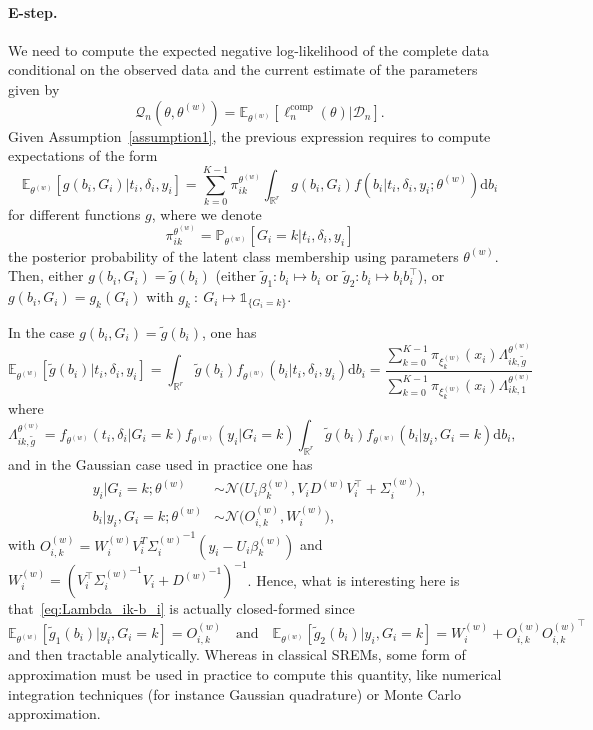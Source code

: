 \documentclass[11pt]{article}
\newcommand{\dd}{\mathrm{d}}
\newcommand{\ind}[1]{\mathds{1}_{#1}}
\newcommand{\cD}{\mathcal D}
\newcommand{\cN}{\mathcal N}
\newcommand{\cQ}{\mathcal Q}
\newcommand{\R}{\mathds R}
\newcommand{\E}{\mathds E}
\renewcommand{\P}{\mathds P}
\begin{document}
\paragraph*{E-step.}

We need to compute the expected negative log-likelihood of the complete data conditional on the observed data and the current estimate of the parameters given by 
\begin{equation*}
  \cQ_n(\theta, \theta^{(w)}) = \E_{\theta^{(w)}}[\ell_n^\text{comp}(\theta) | \cD_n].
\end{equation*}
Given Assumption~\ref{assumption1}, the previous expression requires to compute expectations of the form
\[ \E_{\theta^{(w)}}[ g(b_i, G_i) | t_i, \delta_i, y_i] = \sum_{k=0}^{K-1} \pi_{ik}^{\theta^{(w)}} \int_{\R^r} g(b_i, G_i) f(b_i | t_i, \delta_i, y_i ; \theta^{(w)}) \dd b_i \]
for different functions $g$, where we denote 
\begin{equation}
  \label{eq:pi_ik-def}
  \pi_{ik}^{\theta^{(w)}} = \P_{\theta^{(w)}}[G_i = k | t_i, \delta_i, y_i] 
\end{equation}
the posterior probability of the latent class membership using parameters $\theta^{(w)}$. 
Then, either $g(b_i, G_i) = \tilde g(b_i)$ (either $\tilde g_1: b_i \mapsto b_i$ or $\tilde g_2: b_i \mapsto b_i b_i^\top$), or $g(b_i, G_i) = g_k(G_i)$ with $g_k~:~G_i \mapsto \ind{\{G_i=k\}}$.

In the case $g(b_i, G_i) = \tilde g(b_i)$, one has
\begin{equation*}
  \E_{\theta^{(w)}}[ \tilde g(b_i) | t_i, \delta_i, y_i] = \int_{\R^r} \tilde g(b_i) f_{\theta^{(w)}}(b_i | t_i, \delta_i, y_i) \dd b_i = \dfrac{ \sum_{k=0}^{K-1} \pi_{\xi_k^{(w)}}(x_i) \Lambda_{ik,\tilde g}^{\theta^{(w)}}}{\sum_{k=0}^{K-1} \pi_{\xi_k^{(w)}}(x_i) \Lambda_{ik,1}^{\theta^{(w)}}}
\end{equation*}
where
\begin{equation}
  \label{eq:Lambda_ik-b_i}
  \Lambda_{ik,\tilde g}^{\theta^{(w)}} =  f_{\theta^{(w)}}(t_i, \delta_i | G_i = k) f_{\theta^{(w)}}(y_i | G_i = k) \int_{\R^r} \tilde g(b_i) f_{\theta^{(w)}}(b_i | y_i, G_i = k) \dd b_i,
\end{equation}
and in the Gaussian case used in practice one has
\begin{align*}
  y_i | G_i = k ; \theta^{(w)} &\sim \cN\big(U_i\beta_k^{(w)}, V_iD^{(w)}V_i^\top + \Sigma_i^{(w)}\big), \\
  b_i | y_i, G_i=k ; \theta^{(w)} &\sim \cN \big(O_{i,k}^{(w)}, W_i^{(w)}\big),  
\end{align*}
with $O_{i,k}^{(w)}=W_i^{(w)}V_i^T{\Sigma_i^{(w)}}^{-1}(y_i - U_i\beta_k^{(w)})$ and $W_i^{(w)} = (V_i^\top{\Sigma_i^{(w)}}^{-1}V_i + {D^{(w)}}^{-1})^{-1}$. Hence, what is interesting here is that~\eqref{eq:Lambda_ik-b_i} is actually closed-formed since 
\[ \E_{\theta^{(w)}}[ \tilde g_1(b_i) | y_i, G_i = k] = O_{i,k}^{(w)} \quad \text{and} \quad \E_{\theta^{(w)}}[ \tilde g_2(b_i) | y_i, G_i = k] = W_i^{(w)} + O_{i,k}^{(w)}{O_{i,k}^{(w)}}^\top\]
and then tractable analytically. Whereas in classical SREMs, some form of approximation must be used in practice to compute this quantity, like numerical integration techniques (for instance Gaussian quadrature) or Monte Carlo approximation.
\end{document}
